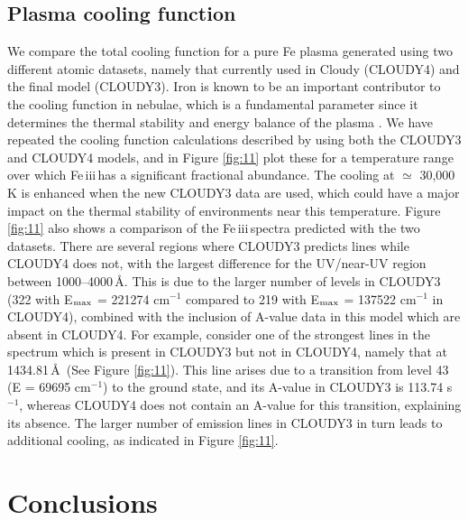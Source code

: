 \documentclass{emulateapj}
\newcommand\fe{Fe\,{\sc iii}\,}
\begin{document}
\subsection{Plasma cooling function}

We compare the total cooling function for a pure Fe plasma generated using two different atomic datasets, namely that
currently used in Cloudy (CLOUDY4) and the final model (CLOUDY3). Iron is known to be an important contributor to the cooling function
in nebulae, which is a fundamental parameter since it determines the thermal stability and energy balance of the plasma \citep{2012ApJS..199...20G}. We have repeated the cooling function calculations described by \citet{2013MNRAS.429.3133L} using 
both the CLOUDY3 and CLOUDY4 models, and in Figure \ref{fig:11} plot these for a temperature range over which
\fe has a significant fractional abundance. The cooling at $\simeq$ 30,000 K is enhanced when the new CLOUDY3 data are used,
which could have a major impact on the thermal stability of environments near this temperature. 
Figure \ref{fig:11} also shows a comparison of the \fe spectra predicted with the two datasets.  There are several 
regions where CLOUDY3 predicts lines while CLOUDY4 does not, with the largest difference for the UV/near-UV region between
1000--4000\,\AA. This is due to the larger number of levels in CLOUDY3 (322 with E$_{\rm max}$ = 221274 cm$^{-1}$ compared to 219 
with E$_{\rm max}$ = 137522 cm$^{-1}$ in CLOUDY4), combined with the 
inclusion of A-value data in this model which are absent in CLOUDY4. For example, consider one of the strongest lines in the 
spectrum which is present in CLOUDY3 but not in CLOUDY4, namely that  at 1434.81\,\AA\ (See Figure \ref{fig:11}). This
 line arises due to a transition from level 43 (E = 69695 cm$^{-1}$) to the ground state, and its A-value 
 in CLOUDY3 is 113.74 s$^{-1}$, whereas CLOUDY4 does not contain an A-value for this transition, explaining 
 its absence. The larger number of emission lines in CLOUDY3 in turn leads to 
 additional cooling, as indicated in Figure \ref{fig:11}.


\section{Conclusions}
\end{document}
